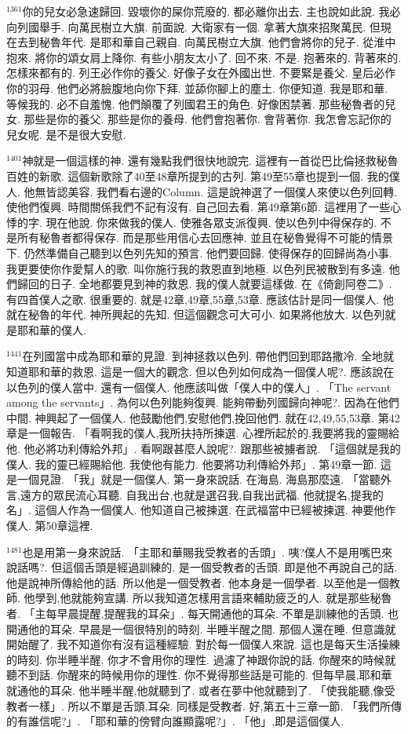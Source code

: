 \documentclass{book}
\begin{document}
$^{1361}$你的兒女必急速歸回.
毀壞你的屎你荒廢的.
都必離你出去.
主也說如此說.
我必向列國舉手.
向萬民樹立大旗.
前面說.
大衛家有一個.
拿著大旗來招聚萬民.
但現在去到秘魯年代.
是耶和華自己親自.
向萬民樹立大旗.
他們會將你的兒子.
從淮中抱來.
將你的頌女肩上降你.
有些小朋友太小了.
回不來.
不是.
抱著來的.
背著來的.
怎樣來都有的.
列王必作你的養父.
好像子女在外國出世.
不要緊是養父.
皇后必作你的羽母.
他們必將臉腹地向你下拜.
並舔你腳上的塵土.
你便知道.
我是耶和華.
等候我的.
必不自羞愧.
他們顛覆了列國君王的角色.
好像困禁著.
那些秘魯者的兒女.
那些是你的養父.
那些是你的養母.
他們會抱著你.
會背著你.
我怎會忘記你的兒女呢.
是不是很大安慰.

$^{1401}$神就是一個這樣的神.
還有幾點我們很快地說完.
這裡有一首從巴比倫拯救秘魯百姓的新歌.
這個新歌除了40至48章所提到的古列.
第49至55章也提到一個.
我的僕人.
他無皆認美容.
我們看右邊的Column.
這是說神選了一個僕人來使以色列回轉.
使他們復興.
時間關係我們不記有沒有.
自己回去看.
第49章第6節.
這裡用了一些心悸的字.
現在他說.
你來做我的僕人.
使雅各眾支派復興.
使以色列中得保存的.
不是所有秘魯者都得保存.
而是那些用信心去回應神.
並且在秘魯覺得不可能的情景下.
仍然準備自己聽到以色列先知的預言.
他們要回歸.
使得保存的回歸尚為小事.
我更要使你作愛幫人的歌.
叫你施行我的救恩直到地極.
以色列民被散到有多遠.
他們歸回的日子.
全地都要見到神的救恩.
我的僕人就要這樣做.
在《倚創阿卷二》.
有四首僕人之歌.
很重要的.
就是42章,49章,55章,53章.
應該估計是同一個僕人.
他就在秘魯的年代.
神所興起的先知.
但這個觀念可大可小.
如果將他放大.
以色列就是耶和華的僕人.

$^{1441}$在列國當中成為耶和華的見證.
到神拯救以色列.
帶他們回到耶路撒冷.
全地就知道耶和華的救恩.
這是一個大的觀念.
但以色列如何成為一個僕人呢?.
應該說在以色列的僕人當中.
還有一個僕人.
他應該叫做「僕人中的僕人」.
「The servant among the servants」.
為何以色列能夠復興.
能夠帶動列國歸向神呢?.
因為在他們中間.
神興起了一個僕人.
他鼓勵他們,安慰他們,挽回他們.
就在42,49,55,53章.
第42章是一個報告.
「看啊我的僕人,我所扶持所揀選.
心裡所起於的,我要將我的靈賜給他.
他必將功利傳給外邦」.
看啊跟甚麼人說呢?.
跟那些被擄者說.
「這個就是我的僕人.
我的靈已經賜給他.
我使他有能力.
他要將功利傳給外邦」.
第49章一節.
這是一個見證.
「我」就是一個僕人.
第一身來說話.
在海島.
海島那麼遠.
「當聽外言,遠方的眾民流心耳聽.
自我出台,也就是選召我,自我出武福.
他就提名,提我的名」.
這個人作為一個僕人.
他知道自己被揀選.
在武福當中已經被揀選.
神要他作僕人.
第50章這裡.

$^{1481}$也是用第一身來說話.
「主耶和華賜我受教者的舌頭」.
咦?僕人不是用嘴巴來說話嗎?.
但這個舌頭是經過訓練的.
是一個受教者的舌頭.
即是他不再說自己的話.
他是說神所傳給他的話.
所以他是一個受教者.
他本身是一個學者.
以至他是一個教師.
他學到,他就能夠宣講.
所以我知道怎樣用言語來輔助疲乏的人.
就是那些秘魯者.
「主每早晨提醒,提醒我的耳朵」.
每天開通他的耳朵.
不單是訓練他的舌頭.
也開通他的耳朵.
早晨是一個很特別的時刻.
半睡半醒之間.
那個人還在睡.
但意識就開始醒了.
我不知道你有沒有這種經驗.
對於每一個僕人來說.
這也是每天生活操練的時刻.
你半睡半醒.
你才不會用你的理性.
過濾了神跟你說的話.
你醒來的時候就聽不到話.
你醒來的時候用你的理性.
你不覺得那些話是可能的.
但每早晨,耶和華就通他的耳朵.
他半睡半醒,他就聽到了.
或者在夢中他就聽到了.
「使我能聽,像受教者一樣」.
所以不單是舌頭,耳朵.
同樣是受教者.
好,第五十三章一節.
「我們所傳的有誰信呢?」.
「耶和華的傍臂向誰顯露呢?」.
「他」,即是這個僕人.
\end{document}
